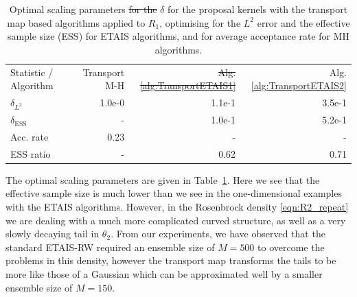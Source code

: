 \documentclass[final]{siamltex}
\newcommand{\edit}[1]{{\color{red} #1}}  %
\providecommand{\DIFadd}[1]{{\protect\color{blue}\uwave{#1}}} %
\providecommand{\DIFdel}[1]{{\protect\color{red}\sout{#1}}}                      %
\providecommand{\DIFaddFL}[1]{\DIFadd{#1}} %
\providecommand{\DIFdelFL}[1]{\DIFdel{#1}} %
\providecommand{\DIFaddbeginFL}{} %
\providecommand{\DIFaddendFL}{} %
\providecommand{\DIFdelbeginFL}{} %
\providecommand{\DIFdelendFL}{} %
\newcommand{\DIFscaledelfig}{0.5}
\newlength{\DIFdelgraphicswidth} %
\newlength{\DIFdelgraphicsheight} %
\newcommand{\DIFaddincludegraphics}[2][]{{\color{blue}\fbox{\DIFOincludegraphics[#1]{#2}}}} %
\newcommand{\DIFdelincludegraphics}[2][]{%
\sbox{\DIFdelgraphicsbox}{\DIFOincludegraphics[#1]{#2}}%
\settoboxwidth{\DIFdelgraphicswidth}{\DIFdelgraphicsbox} %
\settoboxtotalheight{\DIFdelgraphicsheight}{\DIFdelgraphicsbox} %
\scalebox{\DIFscaledelfig}{%
\parbox[b]{\DIFdelgraphicswidth}{\usebox{\DIFdelgraphicsbox}\\[-\baselineskip] \rule{\DIFdelgraphicswidth}{0em}}\llap{\resizebox{\DIFdelgraphicswidth}{\DIFdelgraphicsheight}{%
\setlength{\unitlength}{\DIFdelgraphicswidth}%
\begin{picture}(1,1)%
\thicklines\linethickness{2pt} %
{\color[rgb]{1,0,0}\put(0,0){\framebox(1,1){}}}%
{\color[rgb]{1,0,0}\put(0,0){\line( 1,1){1}}}%
{\color[rgb]{1,0,0}\put(0,1){\line(1,-1){1}}}%
\end{picture}%
}\hspace*{3pt}}} %
} %
\DeclareRobustCommand{\DIFaddbeginFL}{\DIFOaddbeginFL \let\includegraphics\DIFaddincludegraphics} %
\DeclareRobustCommand{\DIFaddendFL}{\DIFOaddendFL \let\includegraphics\DIFOincludegraphics} %
\DeclareRobustCommand{\DIFdelbeginFL}{\DIFOdelbeginFL \let\includegraphics\DIFdelincludegraphics} %
\DeclareRobustCommand{\DIFdelendFL}{\DIFOaddendFL \let\includegraphics\DIFOincludegraphics} %
\begin{document}
\begin{table}[!ht]
\centering
\begin{tabular}{lrrr}
\toprule
	Statistic \quad / \quad Algorithm & Transport M-H &
                                                           \DIFdelbeginFL \DIFdelFL{Alg. \ref{alg:TransportETAIS1} }\DIFdelendFL \DIFaddbeginFL \DIFaddFL{Transport
                                                            ETAIS
                                                            option 1 }\DIFaddendFL & Alg. \ref{alg:TransportETAIS2}  \\ \cmidrule(lr){1-4}
	$\delta_{L^2}$				 & 1.0e-0 & 1.1e-1 & 3.5e-1 \\
	$\delta_{\text{ESS}}$				 & - & 1.0e-1 & 5.2e-1 \\ \cmidrule(lr){1-4}
	Acc. rate							 & 0.23 & - & - \\
	ESS ratio							 & - & 0.62 & 0.71 \\
\bottomrule
\end{tabular}
\caption{Optimal scaling parameters \DIFdelbeginFL \DIFdelFL{for the }\DIFdelendFL \DIFaddbeginFL \edit{$\delta$ for the proposal
    kernels with the} \DIFaddendFL transport map based
  algorithms applied to $R_1$, optimising for the $L^2$ error and
  the effective sample size (ESS) for ETAIS algorithms, and for average
  acceptance rate for MH algorithms.}
\label{tab:R2_opt_scaling}
\end{table}

The optimal scaling parameters are given in
Table~\ref{tab:R2_opt_scaling}. Here we see that the effective sample
size is much lower than we see in the one-dimensional examples with
the ETAIS algorithms. However, in the Rosenbrock density
\eqref{eqn:R2_repeat} we are dealing with a much more complicated
curved structure, as well as a very slowly decaying tail in
$\theta_2$. From our experiments, we have observed that the standard ETAIS-RW required an ensemble size of $M=500$ to overcome the problems in this density, however the transport map transforms the tails to be more like those of a Gaussian which can be approximated well by a smaller ensemble size of $M=150$.
\end{document}
